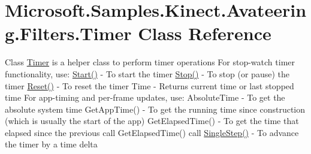 \hypertarget{class_microsoft_1_1_samples_1_1_kinect_1_1_avateering_1_1_filters_1_1_timer}{\section{Microsoft.\+Samples.\+Kinect.\+Avateering.\+Filters.\+Timer Class Reference}
\label{class_microsoft_1_1_samples_1_1_kinect_1_1_avateering_1_1_filters_1_1_timer}
}


Class \hyperlink{class_microsoft_1_1_samples_1_1_kinect_1_1_avateering_1_1_filters_1_1_timer}{Timer} is a helper class to perform timer operations For stop-\/watch timer functionality, use\+: \hyperlink{class_microsoft_1_1_samples_1_1_kinect_1_1_avateering_1_1_filters_1_1_timer_a463741040cda49273475a5722322b73d}{Start()} -\/ To start the timer \hyperlink{class_microsoft_1_1_samples_1_1_kinect_1_1_avateering_1_1_filters_1_1_timer_a018da7ed7832a2257569dd87e68e6137}{Stop()} -\/ To stop (or pause) the timer \hyperlink{class_microsoft_1_1_samples_1_1_kinect_1_1_avateering_1_1_filters_1_1_timer_a938e1304e5e4aaa916a5ef010ff8fc28}{Reset()} -\/ To reset the timer Time -\/ Returns current time or last stopped time For app-\/timing and per-\/frame updates, use\+: Absolute\+Time -\/ To get the absolute system time Get\+App\+Time() -\/ To get the running time since construction (which is usually the start of the app) Get\+Elapsed\+Time() -\/ To get the time that elapsed since the previous call Get\+Elapsed\+Time() call \hyperlink{class_microsoft_1_1_samples_1_1_kinect_1_1_avateering_1_1_filters_1_1_timer_a02e586f1d448e09be37c47a28791d0fc}{Single\+Step()} -\/ To advance the timer by a time delta  


